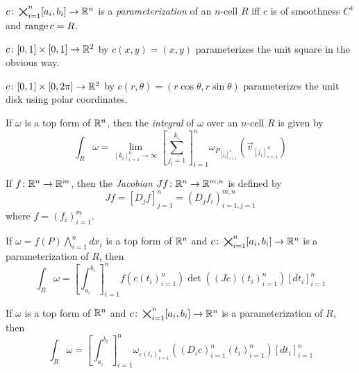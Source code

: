 \documentclass[notes.tex]{subfiles}
\begin{document}
\begin{definition}
    $c\colon \bigtimes_{i = 1}^n [a_i, b_i] \to \mathbb{R}^n$ is a \textit{parameterization} of an $n$-cell $R$ iff $c$ is of smoothness $C^1$ and $\operatorname{range} c = R$.
\end{definition}

\begin{example}
    $c\colon [0, 1] \times [0, 1] \to \mathbb{R}^2$ by $c(x, y) = (x, y)$ parameterizes the unit square in the obvious way.
\end{example}

\begin{example}
    $c\colon [0, 1] \times [0, 2\pi] \to \mathbb{R}^2$ by $c(r, \theta) = (r\cos\theta, r\sin\theta)$ parameterizes the unit disk using polar coordinates.
\end{example}

\begin{definition}
    If $\omega$ is a top form of $\mathbb{R}^n$, then the \textit{integral} of $\omega$ over an $n$-cell $R$ is given by
    \[
        \int_R \omega = \lim_{[k_i]_{i = 1}^n \to \infty} \left[ \sum_{j_i = 1}^{k_i} \right]_{i = 1}^n \omega_{P_{[j_i]_{i = 1}^n}}(\vec{v}_{[j_i]_{i = 1}^n})
    \]
\end{definition}

\begin{definition}[Jacobian]
    If $f\colon \mathbb{R}^n \to \mathbb{R}^m$, then the \textit{Jacobian} $Jf\colon \mathbb{R}^n \to \mathbb{R}^{m, n}$ is defined by
    \[
        Jf = [ D_j f ]_{j = 1}^n = ( D_j f_i )_{i = 1, j = 1}^{m, n}
    \]
    where $f = (f_i)_{i = 1}^m$.
\end{definition}

\begin{theorem}
    If $\omega = f(P)\bigwedge_{i = 1}^n dx_i$ is a top form of $\mathbb{R}^n$ and $c\colon \bigtimes_{i = 1}^n [a_i, b_i] \to \mathbb{R}^n$ is a parameterization of $R$, then
    \[
        \int_R \omega = \left[ \int_{a_i}^{b_i} \right]_{i = 1}^n f(c(t_i)_{i = 1}^n) \det((Jc)(t_i)_{i = 1}^n) [dt_i]_{i = 1}^n
    \]
\end{theorem}

\begin{theorem}
    If $\omega$ is a top form of $\mathbb{R}^n$ and $c\colon \bigtimes_{i = 1}^n [a_i, b_i] \to \mathbb{R}^n$ is a parameterization of $R$, then
    \[
        \int_R \omega = \left[ \int_{a_i}^{b_i} \right]_{i = 1}^n \omega_{c(t_i)_{i = 1}^n}((D_i c)_{i = 1}^n(t_i)_{i = 1}^n) [dt_i]_{i = 1}^n
    \]
\end{theorem}
\end{document}
